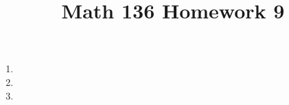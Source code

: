 \documentclass{article}
\title{Math 136 Homework 9}
\begin{document}
    \maketitle
    \begin{enumerate}
      \item 
      \item 
      \item 
    \end{enumerate}
\end{document}
